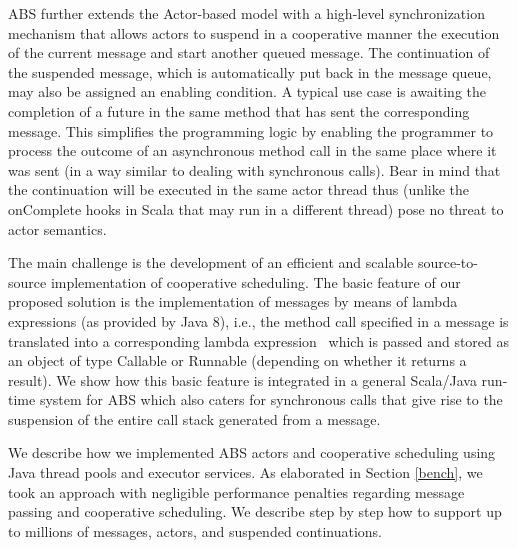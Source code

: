 ABS further extends the Actor-based model with a high-level synchronization mechanism that allows actors to suspend in a cooperative manner the execution of the current message and start another queued message. 
The continuation of the suspended message, which is automatically put back in the message queue, may also be assigned an enabling condition. 
A typical use case is awaiting the completion of a future in the same method that has sent the corresponding message.
This simplifies the programming logic by enabling the programmer to process the outcome of an asynchronous method call in the same place where it was sent (in a way similar to dealing with synchronous calls).
Bear in mind that the continuation will be executed in the same actor thread thus (unlike the {\ttfamily onComplete} hooks in Scala that may run in a different thread) pose no threat to actor semantics.

The main challenge is the development of an efficient and scalable source-to-source implementation of cooperative scheduling. 
The basic feature of our proposed solution is the implementation of messages by means of lambda expressions (as provided by Java 8), i.e., the method call specified in a message
is translated into a corresponding lambda expression~\cite{lambdas} which is passed and stored as
an object of type Callable or Runnable (depending on whether it returns a result). We show how this basic feature is integrated in a general Scala/Java run-time system for ABS which also caters for synchronous calls that give rise to the suspension of the entire call stack generated from a message.

We describe how we implemented ABS actors and cooperative scheduling using Java thread pools and executor services.  
As elaborated in Section \ref{bench}, we took an approach with negligible performance penalties regarding message passing and cooperative scheduling. 
We describe step by step how to support up to millions of messages,  actors, and suspended continuations.


